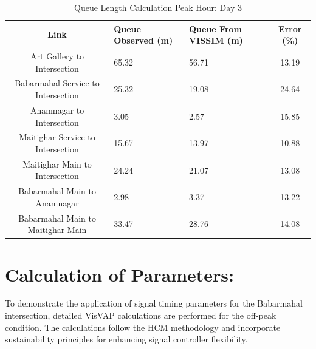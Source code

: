 \begin{table}[t]
\centering
\caption{Queue Length Calculation Peak Hour: Day 3}
\begin{tabular}{|c|p{2cm}|p{2cm}|c|}
\hline
Link & Queue Observed (m) & Queue From VISSIM (m) & Error (\%) \\
\hline
Art Gallery to Intersection & 65.32 & 56.71 & 13.19 \\ \hline
Babarmahal Service to Intersection & 25.32 & 19.08 & 24.64 \\ \hline
Anamnagar to Intersection & 3.05 & 2.57 & 15.85 \\ \hline
Maitighar Service to Intersection & 15.67 & 13.97 & 10.88 \\ \hline
Maitighar Main to Intersection & 24.24 & 21.07 & 13.08 \\ \hline
Babarmahal Main to Anamnagar & 2.98 & 3.37 & 13.22 \\ \hline
Babarmahal Main to Maitighar Main & 33.47 & 28.76 & 14.08 \\ \hline
\end{tabular}
\end{table}





\newpage

\section{Calculation of Parameters:}
 To demonstrate the application of signal timing parameters 
 for the Babarmahal intersection, detailed VisVAP calculations 
 are performed for the off-peak condition. The calculations 
 follow the HCM methodology and incorporate sustainability 
 principles for enhancing signal controller flexibility.

